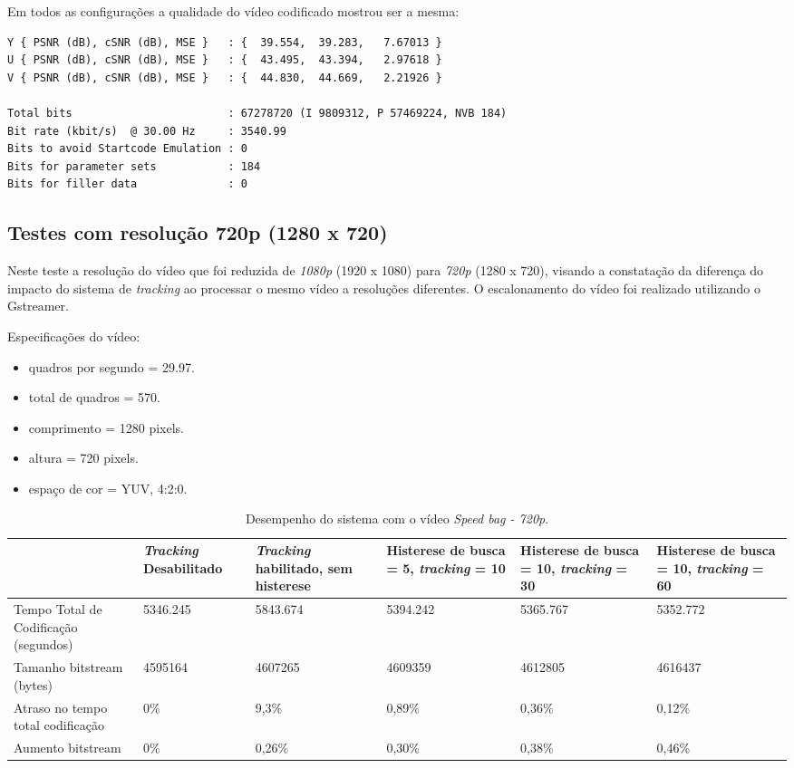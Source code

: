 Em todos as configurações a qualidade do vídeo codificado mostrou ser a mesma:

\begin{lstlisting}
Y { PSNR (dB), cSNR (dB), MSE }   : {  39.554,  39.283,   7.67013 }
U { PSNR (dB), cSNR (dB), MSE }   : {  43.495,  43.394,   2.97618 }
V { PSNR (dB), cSNR (dB), MSE }   : {  44.830,  44.669,   2.21926 }

Total bits                        : 67278720 (I 9809312, P 57469224, NVB 184) 
Bit rate (kbit/s)  @ 30.00 Hz     : 3540.99
Bits to avoid Startcode Emulation : 0 
Bits for parameter sets           : 184 
Bits for filler data              : 0
\end{lstlisting}


\subsection{ Testes com resolução 720p (1280 x 720) }


Neste teste a resolução do vídeo que foi reduzida de \textit{1080p} (1920 x 1080) para \textit{720p} (1280 x 720), visando a constatação da diferença do impacto do sistema de \textit{tracking} ao processar o mesmo vídeo a resoluções diferentes. O escalonamento do vídeo foi realizado utilizando o Gstreamer.


Especificações do vídeo:

\begin{itemize}
        \item quadros por segundo = 29.97.
        \item total de quadros    = 570.
        \item comprimento         = 1280 pixels.
        \item altura              = 720 pixels.
        \item espaço de cor       = YUV, 4:2:0.
\end{itemize}


\begin{table}[H]
\begin{center}
\begin{tabular}{|p{2.3cm}|p{2.3cm}|p{2.3cm}|p{2.3cm}|p{2.3cm}|p{2.3cm}|}
\hline
\textbf{} & \textbf{\textit{Tracking} Desabilitado} & \textbf{\textit{Tracking} habilitado, sem histerese} & \textbf{Histerese de busca = 5, \textit{tracking} = 10} & \textbf{Histerese de busca = 10, \textit{tracking} = 30} & \textbf{Histerese de busca = 10, \textit{tracking} = 60} \\
\hline
Tempo Total de Codificação (segundos) & 5346.245 & 5843.674 & 5394.242 & 5365.767 & 5352.772 \\
\hline
Tamanho bitstream (bytes) & 4595164 & 4607265 & 4609359 & 4612805 & 4616437 \\
\hline
Atraso no tempo total codificação & 0\% & 9,3\% & 0,89\% & 0,36\% & 0,12\% \\
\hline
Aumento bitstream  & 0\% & 0,26\% & 0,30\% & 0,38\% & 0,46\% \\
\hline
\end{tabular}
\caption{Desempenho do sistema com o vídeo \textit{Speed bag - 720p}.}
\label{tab:space_overhead}
\end{center}
\end{table}


